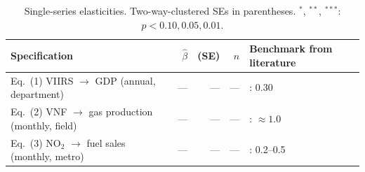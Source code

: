 \begin{table}[H]
\centering
\caption{Single-series elasticities. Two-way-clustered SEs in parentheses.
$^{*}$, $^{**}$, $^{***}$: $p<0.10,0.05,0.01$.}
\label{tab:elasticities}
\small
\begin{tabular}{lrrrl}
\toprule
Specification & $\hat\beta$ & (SE) & $n$ & Benchmark from literature \\
\midrule
Eq.~(1) VIIRS $\to$ GDP (annual, department) & --- & --- & --- & \citet{hsw2012}: 0.30 \\
Eq.~(2) VNF $\to$ gas production (monthly, field) & --- & --- & --- & \citet{do_etal2018}: $\approx 1.0$ \\
Eq.~(3) NO$_2$ $\to$ fuel sales (monthly, metro) & --- & --- & --- & \citet{bauwens2020}: 0.2--0.5 \\
\bottomrule
\end{tabular}
\end{table}
